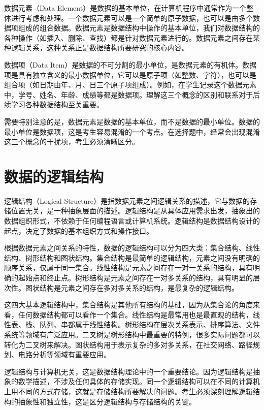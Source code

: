 \documentclass[12pt, a4paper]{article}
\begin{document}
数据元素（Data Element）是数据的基本单位，在计算机程序中通常作为一个整体进行考虑和处理。一个数据元素可以是一个简单的原子数据，也可以是由多个数据项组成的组合数据。数据元素是数据结构中操作的基本单位，我们对数据结构的各种操作（如插入、删除、查找）都是针对数据元素进行的。数据元素之间存在某种逻辑关系，这种关系正是数据结构所要研究的核心内容。

数据项（Data Item）是数据的不可分割的最小单位，是数据元素的有机体。数据项是具有独立含义的最小数据单位，它可以是原子项（如整数、字符），也可以是组合项（如日期由年、月、日三个原子项组成）。例如，在学生记录这个数据元素中，学号、姓名、年龄、成绩等都是数据项。理解这三个概念的区别和联系对于后续学习各种数据结构至关重要。

需要特别注意的是，数据元素是数据的基本单位，而不是数据的最小单位。数据的最小单位是数据项，这是考生容易混淆的一个考点。在选择题中，经常会出现混淆这三个概念的干扰项，考生必须清晰区分。

\section{数据的逻辑结构}

逻辑结构（Logical Structure）是指数据元素之间逻辑关系的描述，它与数据的存储位置无关，是一种抽象层面的描述。逻辑结构是从具体应用需求出发，抽象出的数据组织形式，不依赖于任何编程语言或计算机系统。逻辑结构是数据结构设计的起点，决定了数据的基本组织方式和操作接口。

根据数据元素之间关系的特性，数据的逻辑结构可以分为四大类：集合结构、线性结构、树形结构和图状结构。集合结构是最简单的逻辑结构，元素之间没有明确的顺序关系，仅属于同一集合。线性结构是元素之间存在一对一关系的结构，具有明确的起始点和终止点。树形结构是元素之间存在一对多关系的结构，具有明显的层次性。图状结构是元素之间存在多对多关系的结构，是最复杂的逻辑结构。

这四大基本逻辑结构中，集合结构是其他所有结构的基础，因为从集合论的角度来看，任何数据结构都可以看作一个集合。线性结构是最常用也是最直观的结构，线性表、栈、队列、串都属于线性结构。树形结构在层次关系表示、排序算法、文件系统等领域有广泛应用。二叉树是树形结构中最重要的特例，很多实际问题都可以转化为二叉树来解决。图状结构用于表示复杂的多对多关系，在社交网络、路径规划、电路分析等领域有重要应用。

逻辑结构与计算机无关，这是数据结构理论中的一个重要结论。因为逻辑结构是抽象的数学描述，不涉及任何具体的存储实现。同一个逻辑结构可以在不同的计算机上用不同的方式存储，这就是存储结构所要解决的问题。考生必须深刻理解逻辑结构的抽象性和独立性，这是区分逻辑结构与存储结构的关键。
\end{document}
